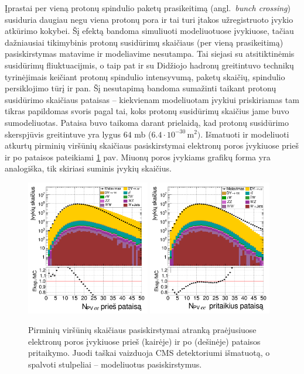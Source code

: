 \documentclass[a4paper, 12pt, twoside]{article}
\begin{document}
Įprastai per vieną protonų spindulio paketų prasikeitimą (angl.\ \textit{bunch crossing}) susiduria
daugiau negu viena protonų pora ir tai turi įtakos užregistruoto įvykio atkūrimo kokybei.
Šį efektą bandoma simuliuoti modeliuotuose įvykiuose, tačiau dažniausiai tikimybinis protonų susidūrimų
skaičiaus (per vieną prasikeitimą) pasiskirstymas matavime ir modeliavime nesutampa.
Tai siejasi su atsitiktinėmis susidūrimų fliuktuacijmis, o taip pat ir su Didžiojo hadronų greitintuvo
technikų tyrinėjimais keičiant protonų spindulio intensyvumą, paketų skaičių, spindulio persiklojimo
tūrį ir pan.
Šį nesutapimą bandoma sumažinti taikant protonų susidūrimo skaičiaus pataisas -- kiekvienam modeliuotam
įvykiui priskiriamas tam tikras papildomas svoris pagal tai, koks protonų susidūrimų skaičius jame buvo sumodeliuotas.
Pataisa buvo taikoma darant prielaidą, kad protonų susidūrimo skerspjūvis greitintuve yra lygus $64$ mb
($6.4 \cdot 10^{-30} \, \mathrm{m}^2)$.
Išmatuoti ir modeliuoti atkurtų pirminių viršūnių skaičiaus pasiskirstymai elektronų poros įvykiuose
prieš ir po pataisos pateikiami \ref{fig:PUba} pav.
Miuonų poros įvykiams grafikų forma yra analogiška, tik skiriasi suminis įvykių skaičius.

\begin{figure}[tbp]
	\includegraphics[width=0.48\textwidth]{nVTXee_before.png}
	\includegraphics[width=0.48\textwidth]{nVTXee_after.png}
	\caption{\label{fig:PUba} Pirminių viršūnių skaičiaus pasiskirstymai atranką praėjusiuose elektronų poros
		įvykiuose prieš (kairėje) ir po (dešinėje) pataisos pritaikymo.
		Juodi taškai vaizduoja CMS detektoriumi išmatuotą, o spalvoti stulpeliai -- modeliuotus pasiskirstymus.}
\end{figure}
\end{document}
